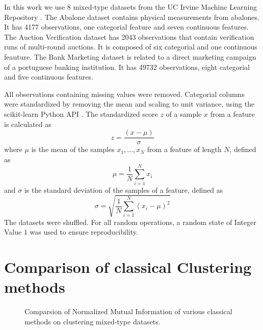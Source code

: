 In this work we use 8 mixed-type datasets from the UC Irvine Machine Learning Repository \cite{uci_ml_rpo}. 
The Abalone dataset \cite{abalone} contains physical measurements from abalones. It has 4177 observations, one categorial feature and seven continuous features.
The Auction Verification dataset \cite{auction_verification} has 2043 observations that contain verification runs of multi-round auctions. It is composed of six categorial and one continuous feauture.
The Bank Marketing dataset \cite{bank_marketing} is related to a direct marketing campaign of a portuguese banking institution. It has 49732 observations, eight categorial and five continuous features.

All observations containing missing values were removed. Categorial columns were standardized by removing the mean and scaling to unit variance, using the scikit-learn Python API \cite{scikit_learn}. The standardized score $z$ of a sample $x$ from a feature is calculated as
$$z = \frac{(x-\mu)}{\sigma}$$
where $\mu$ is the mean of the samples $x_1, ...,x_N$ from a feature of length $N$, defined as
$$\mu = \frac{1}{N} \sum^{N}_{i=1} x_i$$
and $\sigma$ is the standard deviation of the samples of a feature, defined as
$$\sigma = \sqrt{\frac{1}{N} \sum^{N}_{i=1}(x_i - \mu)^2}$$
The datasets were shuffled. For all random operations, a random state of Integer Value $1$ was used to ensure reproducibility.





\section{Comparison of classical Clustering methods}

\begin{figure}
\begin{center}
\end{center}
\caption{Comparsion of Normalized Mutual Information of various classical methods on clustering mixed-type datasets.}
\label{classical_comparison_nmi}
\end{figure}

